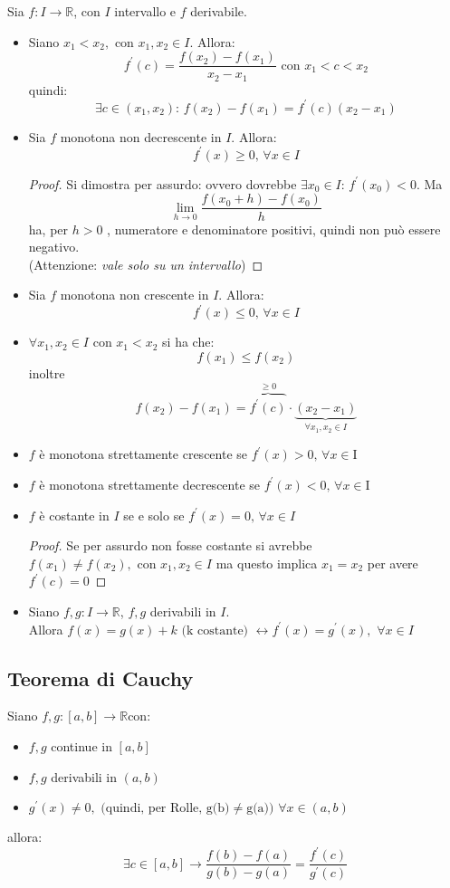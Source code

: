 \documentclass[a4paper,12pt, oneside]{book}
\begin{document}
\begin{corollario} Sia
  $f:I\rightarrow \mathbb{R}$, con $I$ intervallo e $f$ derivabile.
  \begin{itemize}
    \item Siano $x_1<x_2, \mbox{ con } x_1,x_2\in I$. Allora:
    $$f^{'}(c)=\frac{f(x_2)-f(x_1)}{x_2-x_1}\mbox{ con } x_1<c<x_2$$
    quindi:
    $$\exists c\in(x_1,x_2)\mbox{: } f(x_2)-f(x_1)=f^{'}(c)(x_2-x_1)$$
    \item Sia $f$ monotona non decrescente in $I$. Allora: $$f^{'}(x)\geq
    0\mbox{, }\forall x\in I$$
    \begin{proof} Si dimostra per assurdo: ovvero dovrebbe $\exists x_0\in
      I\mbox{: } f^{'}(x_0)<0$. Ma $$\lim_{h\rightarrow 0} \frac{f(x_0+h)-f(x_0)}{h}$$
      ha, per $h>0$ , numeratore e denominatore positivi, quindi non può essere
      negativo.\\ (Attenzione: \textit{vale solo su un intervallo})
    \end{proof}
    \item Sia $f$ monotona non crescente in $I$. Allora: $$f^{'}(x)\leq 0\mbox{,
    }\forall x\in I$$
    \item $\forall x_1, x_2 \in I\mbox{ con } x_1<x_2$ si ha che:
    $$f(x_1)\leq f(x_2)$$
    inoltre $$f(x_2)-f(x_1)=\overbrace{f^{'}(c)}^{\geq
      0}\cdot\underbrace{(x_2-x_1)}_{\forall x_1, x_2 \in I}$$
    \item $f$ è monotona strettamente crescente se $f^{'}(x)>0 \mbox{, }\forall
    x\in $I
    \item $f$ è monotona strettamente decrescente se $f^{'}(x)<0 \mbox{,
    }\forall x\in $I
    \item $f$ è costante in $I$ se e solo se $f^{'}(x)=0\mbox{, }\forall x\in I$
    \begin{proof} Se per assurdo non fosse costante si avrebbe $f(x_1)\neq
      f(x_2), \mbox{ con } x_1,x_2\in I$ ma questo implica $x_1=x_2$ per avere
      $f^{'}(c)=0$
    \end{proof}
    \item Siano $f,g:I\rightarrow \mathbb{R}$, $f,g$ derivabili in $I$. \\Allora
    $f(x)=g(x)+k\mbox { (k costante) }\longleftrightarrow f^{'}(x)=g^{'}(x),\mbox{
    }\forall x\in I$
  \end{itemize}
\end{corollario}
\subsection{Teorema di Cauchy}
\begin{teorema}[di Cauchy] Siano $f,g:[a,b]\rightarrow \mathbb{R}$con:
  \begin{itemize}
    \item $f,g$ continue in $[a,b]$
    \item $f,g$ derivabili in $(a,b)$
    \item $g^{'}(x)\neq 0,\mbox{ (quindi, per Rolle, g(b)}\neq\mbox{g(a)) }
    \forall x\in (a,b)$
  \end{itemize} allora: $$\exists c\in
  [a,b]\rightarrow\frac{f(b)-f(a)}{g(b)-g(a)}=\frac{f^{'}(c)}{g^{'}(c)}$$
\end{teorema}
\end{document}
